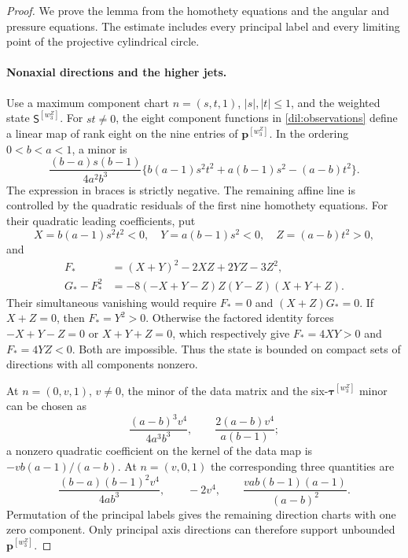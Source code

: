\documentclass[11pt,a4paper]{article}
\numberwithin{equation}{section}
\theoremstyle{plain}
\theoremstyle{definition}
\theoremstyle{remark}
\begin{document}
\begin{proof}
We prove the lemma from the homothety equations and the angular and
pressure equations. The estimate includes every principal label
and every limiting point of the projective cylindrical circle.

\paragraph{Nonaxial directions and the higher jets.}
Use a maximum component chart $n=(s,t,1)$, $|s|,|t|\le1$, and the
weighted state $\mathsf S^{[w_3^Z]}$.  For $st\ne0$, the eight component functions in
\eqref{dil:observations} define a linear map of rank eight on the nine
entries of $\boldsymbol p^{[w_3^Z]}$.  In the ordering $0<b<a<1$, a minor is
\begin{equation}\label{dil:eight-minor}
 \frac{(b-a)s(b-1)}{4a^2b^3}
 \{b(a-1)s^2t^2+a(b-1)s^2-(a-b)t^2\}.
\end{equation}
The expression in braces is strictly negative.  The remaining affine
line is controlled by the quadratic residuals of the first nine
homothety equations.  For their quadratic leading coefficients, put
\[
 X=b(a-1)s^2t^2<0,\quad Y=a(b-1)s^2<0,\quad Z=(a-b)t^2>0,
\]
and
\[
 \begin{aligned}
 F_*&=(X+Y)^2-2XZ+2YZ-3Z^2,\\
 G_*-F_*^2&=-8(-X+Y-Z)Z(Y-Z)(X+Y+Z).
 \end{aligned}
\]
Their simultaneous vanishing would require $F_*=0$ and $(X+Z)G_*=0$.
If $X+Z=0$, then $F_*=Y^2>0$.  Otherwise the factored identity forces
$-X+Y-Z=0$ or $X+Y+Z=0$, which respectively give $F_*=4XY>0$ and
$F_*=4YZ<0$.  Both are impossible.  Thus the state is bounded on compact
sets of directions with all components nonzero.

At $n=(0,v,1)$, $v\ne0$, the minor of the data matrix and the six-$\boldsymbol\tau^{[w_3^Z]}$ minor
can be chosen as
\[
 \frac{(a-b)^3v^4}{4a^3b^3},\qquad
 \frac{2(a-b)v^4}{a(b-1)};
\]
a nonzero quadratic coefficient on the kernel of the data map is
$-vb(a-1)/(a-b)$.  At $n=(v,0,1)$ the corresponding three quantities
are
\[
 \frac{(b-a)(b-1)^2v^4}{4ab^3},\qquad -2v^4,\qquad
 \frac{vab(b-1)(a-1)}{(a-b)^2}.
\]
Permutation of the principal labels gives the remaining direction charts with one zero component. Only principal axis
directions can therefore support unbounded $\boldsymbol p^{[w_3^Z]}$.


\end{proof}
\end{document}

